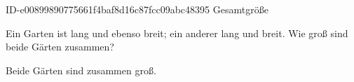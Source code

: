 \begin{exercise}
      {ID-e00899890775661f4baf8d16c87fcc09abc48395}
      {Gesamtgröße}
  \ifproblem\problem\par
    Ein Garten ist  lang und ebenso breit; ein anderer  lang
    und  breit. Wie groß sind beide Gärten zusammen?
  \fi
  \ifoutcome\outcome\par
    Beide Gärten sind zusammen  groß.
  \fi
\end{exercise}
